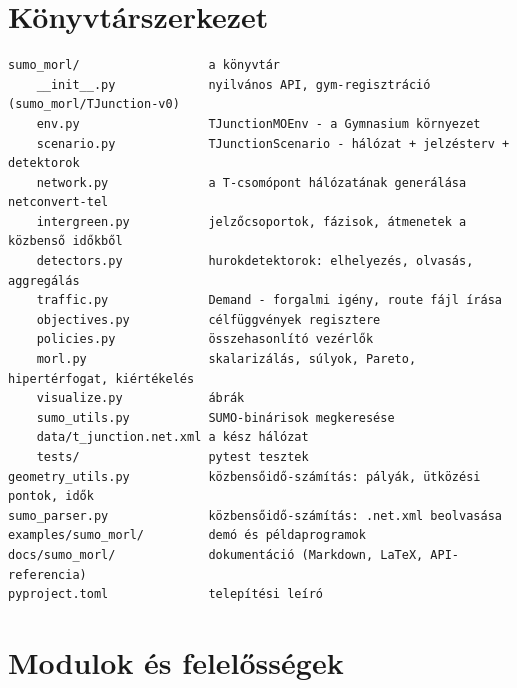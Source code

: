 \documentclass[11pt,a4paper]{article}
\begin{document}
\section{Könyvtárszerkezet}

\begin{lstlisting}[style=bash,basicstyle=\ttfamily\footnotesize]
sumo_morl/                  a könyvtár
    __init__.py             nyilvános API, gym-regisztráció (sumo_morl/TJunction-v0)
    env.py                  TJunctionMOEnv - a Gymnasium környezet
    scenario.py             TJunctionScenario - hálózat + jelzésterv + detektorok
    network.py              a T-csomópont hálózatának generálása netconvert-tel
    intergreen.py           jelzőcsoportok, fázisok, átmenetek a közbenső időkből
    detectors.py            hurokdetektorok: elhelyezés, olvasás, aggregálás
    traffic.py              Demand - forgalmi igény, route fájl írása
    objectives.py           célfüggvények regisztere
    policies.py             összehasonlító vezérlők
    morl.py                 skalarizálás, súlyok, Pareto, hipertérfogat, kiértékelés
    visualize.py            ábrák
    sumo_utils.py           SUMO-binárisok megkeresése
    data/t_junction.net.xml a kész hálózat
    tests/                  pytest tesztek
geometry_utils.py           közbensőidő-számítás: pályák, ütközési pontok, idők
sumo_parser.py              közbensőidő-számítás: .net.xml beolvasása
examples/sumo_morl/         demó és példaprogramok
docs/sumo_morl/             dokumentáció (Markdown, LaTeX, API-referencia)
pyproject.toml              telepítési leíró
\end{lstlisting}

\section{Modulok és felelősségek}
\end{document}
